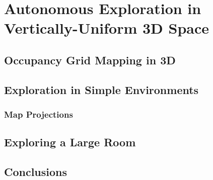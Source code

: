
\chapter{Autonomous Exploration in Vertically-Uniform 3D Space} \label{chap:ae3Dsimple}

\section{Occupancy Grid Mapping in 3D}

\section{Exploration in Simple Environments }

\subsection{Map Projections}

\section{Exploring a Large Room}


\section{Conclusions}




